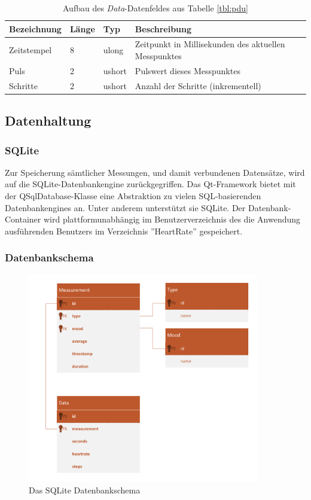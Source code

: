 \begin{table}[h]
	\centering
		\begin{tabularx}{\textwidth}{l|l|l|X}
			\hline
			Bezeichnung & Länge & Typ & Beschreibung \\
			\hline
			\hline
			Zeitstempel & 8 & ulong & Zeitpunkt in Millisekunden des aktuellen Messpunktes\\
			\hline
			Puls & 2 & ushort & Pulswert dieses Messpunktes\\
			\hline
			Schritte & 2 & ushort & Anzahl der Schritte (inkrementell)\\
			\hline
		\end{tabularx}
		\caption{Aufbau des \textit{Data}-Datenfeldes aus Tabelle \ref{tbl:pdu}}
		\label{tbl:datafield-description}
\end{table}

\subsection{Datenhaltung}
\subsubsection{SQLite}
Zur Speicherung sämtlicher Messungen, und damit verbundenen Datensätze, wird auf die SQLite-Datenbankengine zurückgegriffen. Das Qt-Framework bietet mit der QSqlDatabase-Klasse eine Abstraktion zu vielen SQL-basierenden Datenbankengines an\cite{qsqldatabase}. Unter anderem unterstützt sie SQLite. Der Datenbank-Container wird plattformunabhängig im Benutzerverzeichnis des die Anwendung ausführenden Benutzers im Verzeichnis ''HeartRate'' gespeichert.

\subsubsection{Datenbankschema}
\begin{figure}[H]
	\centering
	\includegraphics[width=0.9\textwidth]{images/database-schema.pdf}
	\caption{Das SQLite Datenbankschema}
	\label{pic:database-scheme}
\end{figure}

